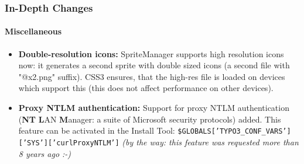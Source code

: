\begin{frame}[fragile]
	\frametitle{In-Depth Changes}
	\framesubtitle{Miscellaneous}

	\begin{itemize}

		\item \textbf{Double-resolution icons:}\newline
			\small
				SpriteManager supports high resolution icons now: it generates a second sprite with double sized icons (a second file with "@x2.png" suffix). CSS3 ensures, that the high-res file is loaded on devices which support this\newline
				(this does not affect performance on other devices).
			\normalsize

		\item \textbf{Proxy NTLM authentication:}\newline
			\small
				Support for proxy NTLM authentication (\textbf{NT} \textbf{L}AN \textbf{M}anager: a suite of Microsoft security protocols) added. This feature can be activated in the Install Tool:\newline
			\normalsize
			\smaller
				\texttt{\$GLOBALS['TYPO3\_CONF\_VARS']['SYS']['curlProxyNTLM']}\newline
				\emph{(by the way: this feature was requested more than 8 years ago :-)}
			\normalsize

	\end{itemize}
	
\end{frame}


